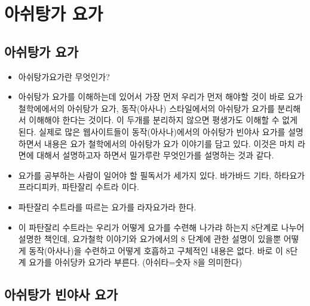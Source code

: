 \documentclass[12pt, a4paper, oneside]{book}
\let\stdsection\section
\renewcommand\section{\newpage\stdsection}
\begin{document}
%
	\section{아쉬탕가 요가}


	\subsection{아쉬탕가 요가}

		\begin{itemize}
			\item 	아쉬탕가요가란 무엇인가?
			\item 	아쉬탕가 요가를 이해하는데 있어서 가장 먼저 우리가 먼저 해야할 것이 바로 요가철학에에서의 아쉬탕가 요가, 동작(아사나) 스타일에서의 아쉬탕가 요가를 분리해서 이해해야 한다는 것이다. 이 두개를 분리하지 않으면 평생가도 이해할 수 없게 된다.
실제로 많은 웹사이트들이 동작(아사나)에서의 아쉬탕가 빈야사 요가를 설명하면서 내용은 요가 철학에서의 아쉬탕가 요가 이야기를 담고 있다. 이것은 마치 라면에 대해서 설명하고자 하면서 밀가루란 무엇인가를 설명하는 것과 같다.

			\item 	요가를 공부하는 사람이 일어야 할 필독서가 세가지 있다.
바가바드 기타, 하타요가 프라디피카, 파탄잘리 수트라 이다.
			\item 	파탄잘리 수트라를 따르는 요가를 라자요가라 한다.
			\item 	이 파탄잘리 수트라는 우리가 어떻게 요가를 수련해 나가랴 하는지 8단계로 나누어 설명한 책인데, 요가철학 이야기와 요가에서의 8 단계에 관한 설명이 있을뿐 어떻게 동작(아사나)을 수련하고 어떻게 호흡하고 구체적인 내용은 없다.
바로 이 8단계 요가를 아쉬당카 요가라 부른다. (아쉬타=숫자 8을 의미한다)

		\end{itemize}



	\subsection{아쉬탕가 빈야사 요가}
\end{document}
